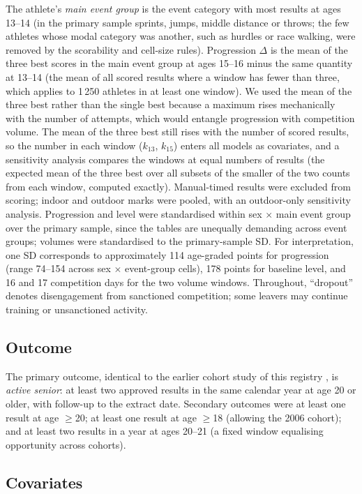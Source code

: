 \documentclass[12pt,a4paper]{article}
\begin{document}
The athlete's \emph{main event group} is the event category with most results at ages 13--14 (in the primary sample sprints, jumps, middle distance or throws; the few athletes whose modal category was another, such as hurdles or race walking, were removed by the scorability and cell-size rules). Progression $\Delta$ is the mean of the three best scores in the main event group at ages 15--16 minus the same quantity at 13--14 (the mean of all scored results where a window has fewer than three, which applies to 1\,250 athletes in at least one window). We used the mean of the three best rather than the single best because a maximum rises mechanically with the number of attempts, which would entangle progression with competition volume. The mean of the three best still rises with the number of scored results, so the number in each window ($k_{13}$, $k_{15}$) enters all models as covariates, and a sensitivity analysis compares the windows at equal numbers of results (the expected mean of the three best over all subsets of the smaller of the two counts from each window, computed exactly). Manual-timed results were excluded from scoring; indoor and outdoor marks were pooled, with an outdoor-only sensitivity analysis. Progression and level were standardised within sex $\times$ main event group over the primary sample, since the tables are unequally demanding across event groups; volumes were standardised to the primary-sample SD. For interpretation, one SD corresponds to approximately 114 age-graded points for progression (range 74--154 across sex $\times$ event-group cells), 178 points for baseline level, and 16 and 17 competition days for the two volume windows. Throughout, ``dropout'' denotes disengagement from sanctioned competition; some leavers may continue training or unsanctioned activity.

\subsection{Outcome}

The primary outcome, identical to the earlier cohort study of this registry \citep{guttormsen2026dropout}, is \emph{active senior}: at least two approved results in the same calendar year at age 20 or older, with follow-up to the extract date. Secondary outcomes were at least one result at age $\geq$20; at least one result at age $\geq$18 (allowing the 2006 cohort); and at least two results in a year at ages 20--21 (a fixed window equalising opportunity across cohorts).

\subsection{Covariates}
\end{document}
